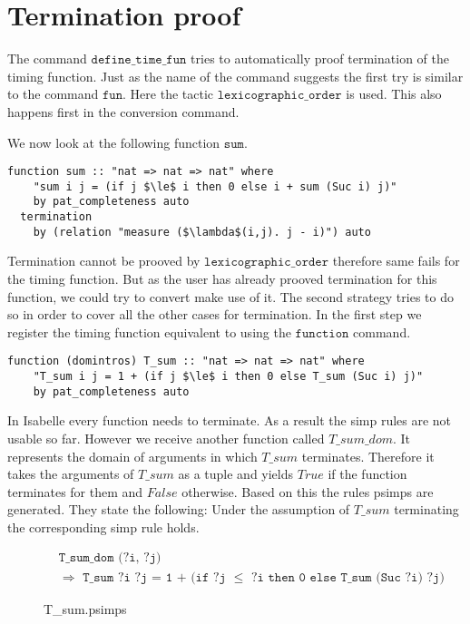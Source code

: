 

\section{Termination proof} \label{chapter:termination}

The command $\texttt{define\_time\_fun}$ tries to automatically proof termination of the timing function.
Just as the name of the command suggests the first try is similar to the command $\texttt{fun}$.
Here the tactic $\texttt{lexicographic\_order}$ is used.
This also happens first in the conversion command.

We now look at the following function $\texttt{sum}$.
\begin{lstlisting}[language=isabelle,mathescape=true]
  function sum :: "nat => nat => nat" where
    "sum i j = (if j $\le$ i then 0 else i + sum (Suc i) j)"
    by pat_completeness auto
  termination
    by (relation "measure ($\lambda$(i,j). j - i)") auto
\end{lstlisting}
Termination cannot be prooved by $\texttt{lexicographic\_order}$ therefore same fails for the timing function.
But as the user has already prooved termination for this function, we could try to convert make use of it.
The second strategy tries to do so in order to cover all the other cases for termination.
In the first step we register the timing function equivalent to using the $\texttt{function}$ command.
\begin{lstlisting}[language=isabelle,mathescape=true,caption=Function registration,label=lst:sum_reg]
  function (domintros) T_sum :: "nat => nat => nat" where
    "T_sum i j = 1 + (if j $\le$ i then 0 else T_sum (Suc i) j)"
    by pat_completeness auto
\end{lstlisting}
In Isabelle every function needs to terminate.
As a result the simp rules are not usable so far.
However we receive another function called $T\_sum\_dom$.
It represents the domain of arguments in which $T\_sum$ terminates.
Therefore it takes the arguments of $T\_sum$ as a tuple and yields $True$ if the function terminates for them and $False$ otherwise.
Based on this the rules psimps are generated.
They state the following: Under the assumption of $T\_sum$ terminating the corresponding simp rule holds.

\begin{figure}[H]
\begin{align*}
  &\texttt{T\_sum\_dom (?i, ?j)}\\
  &\texttt{$\Longrightarrow$ T\_sum ?i ?j = 1 + (if ?j $\le$ ?i then 0 else T\_sum (Suc ?i) ?j)}
\end{align*}
\caption{T\_sum.psimps}
\end{figure}

